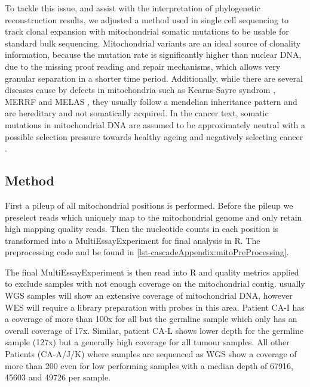 To tackle this issue, and assist with the interpretation of phylogenetic reconstruction results, we adjusted a method used in single cell sequencing to track clonal expansion with mitochondrial somatic mutations \cite{Ludwig2019} to be usable for standard bulk sequencing. Mitochondrial variants are an ideal source of clonality information, because the mutation rate is significantly higher than nuclear DNA, due to the missing proof reading and repair mechanisms, which allows very granular separation in a shorter time period. Additionally, while there are several diseases cause by defects in mitochondria such as Kearns-Sayre syndrom \cite{Harvey1992}, MERRF \cite{Adam1993} and MELAS \cite{Hirano1992}, they usually follow a mendelian inheritance pattern and are hereditary and not somatically acquired. In the cancer text, somatic mutations in mitochondrial DNA are assumed to be approximately neutral with a possible selection pressure towards healthy ageing and negatively selecting cancer \cite{Rodell2013,Yuan2020}.

\subsection{Method}
\label{cascade-sec:mitoMethod}

First a pileup of all mitochondrial positions is performed. Before the pileup we preselect reads which uniquely map to the mitochondrial genome and only retain high mapping quality reads. Then the nucleotide counts in each position is transformed into a MultiEssayExperiment \cite{Ramos2017} for final analysis in R. The preprocessing code and be found in \autoref{lst-cascadeAppendix:mitoPreProcessing}.

The final MultiEssayExperiment is then read into R and quality metrics applied to exclude samples with not enough coverage on the mitochondrial contig. usually WGS samples will show an extensive coverage of mitochondrial DNA, however WES will require a library preparation with probes in this area. Patient CA-I has a coverage of more than 100x for all but the germline sample which only has an overall coverage of 17x. Similar, patient CA-L shows lower depth for the germline sample (127x) but a generally high coverage for all tumour samples. All other Patients (CA-A/J/K) where samples are sequenced as WGS show a coverage of more than 200 even for low performing samples with a median depth of \num{67916}, \num{45603} and \num{49726} per sample.

